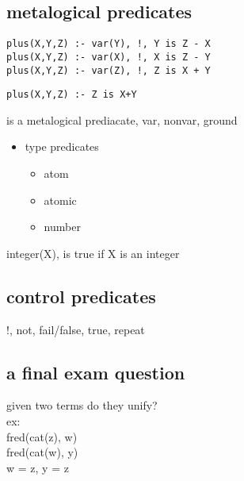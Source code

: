\documentclass[11pt]{article}
\begin{document}
\subsection{metalogical predicates}
\label{sec-22-2}
\begin{verbatim}
plus(X,Y,Z) :- var(Y), !, Y is Z - X
plus(X,Y,Z) :- var(X), !, X is Z - Y
plus(X,Y,Z) :- var(Z), !, Z is X + Y
\end{verbatim}

\begin{verbatim}
plus(X,Y,Z) :- Z is X+Y
\end{verbatim}
is a metalogical prediacate, var, nonvar, ground

\begin{itemize}
\item type predicates
\begin{itemize}
\item atom
\item atomic
\item number
\end{itemize}
\end{itemize}

integer(X), is true if X is an integer

\subsection{control predicates}
\label{sec-22-3}
!, not, fail/false, true, repeat

\subsection{a final exam question}
\label{sec-22-4}
given two terms do they unify?\\
ex:\\
fred(cat(z), w)\\
fred(cat(w), y)\\
w = z, y = z\\
\end{document}
